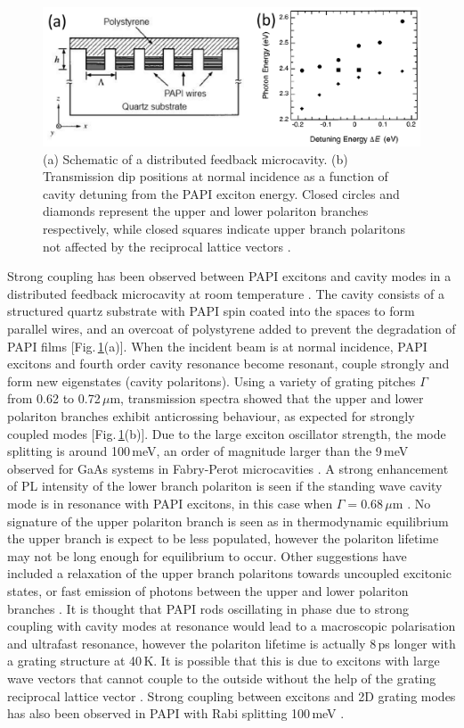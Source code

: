 \begin{figure}[h!]
\centering
\includegraphics[width=\textwidth]{Fig20}
\caption{(a) Schematic of a distributed feedback microcavity. (b) Transmission dip positions at normal incidence as a function of cavity detuning from the PAPI exciton energy. Closed circles and diamonds represent the upper and lower polariton branches respectively, while closed squares indicate upper branch polaritons not affected by the reciprocal lattice vectors \cite{Fujita1998}.}
\label{2Fig20}
\end{figure}
Strong coupling has been observed between PAPI excitons and cavity modes in a distributed feedback microcavity at room temperature \cite{Fujita1998, Fujita1999, Fujita2000}. The cavity consists of a structured quartz substrate with PAPI spin coated into the spaces to form parallel wires, and an overcoat of polystyrene added to prevent the degradation of PAPI films [Fig.\,\ref{2Fig20}(a)]. When the incident beam is at normal incidence, PAPI excitons and fourth order cavity resonance become resonant, couple strongly and form new eigenstates (cavity polaritons). Using a variety of grating pitches $\Gamma$ from 0.62 to 0.72\,$\mu$m, transmission spectra showed that the upper and lower polariton branches exhibit anticrossing behaviour, as expected for strongly coupled modes [Fig.\,\ref{2Fig20}(b)]. Due to the large exciton oscillator strength, the mode splitting is around 100\,meV, an order of magnitude larger than the 9\,meV observed for GaAs systems in Fabry-Perot microcavities \cite{Fujita1998}. A strong enhancement of PL intensity of the lower branch polariton is seen if the standing wave cavity mode is in resonance with PAPI excitons, in this case when $\Gamma=0.68\,\mu$m \cite{Fujita1999}. No signature of the upper polariton branch is seen as in thermodynamic equilibrium the upper branch is expect to be less populated, however the polariton lifetime may not be long enough for equilibrium to occur. Other suggestions have included a relaxation of the upper branch polaritons towards uncoupled excitonic states, or fast emission of photons between the upper and lower polariton branches \cite{Lanty2008}. It is thought that PAPI rods oscillating in phase due to strong coupling with cavity modes at resonance would lead to a macroscopic polarisation and ultrafast resonance, however the polariton lifetime is actually 8\,ps longer with a grating structure at 40\,K. It is possible that this is due to excitons with large wave vectors that cannot couple to the outside without the help of the grating reciprocal lattice vector \cite{Fujita2000}. Strong coupling between excitons and 2D grating modes has also been observed in PAPI with Rabi splitting 100\,meV \cite{Ishi-Hayase2003}.

